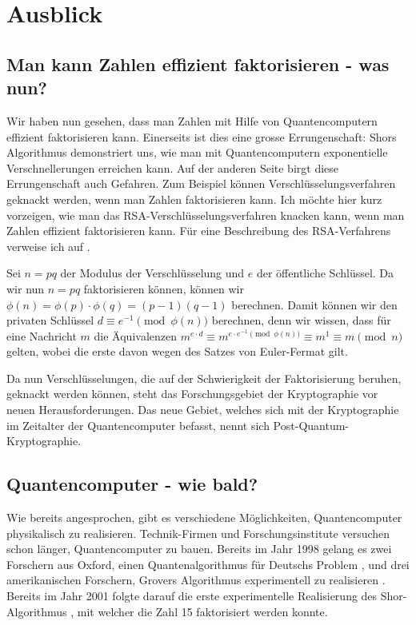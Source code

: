 \chapter{Ausblick}
\section{Man kann Zahlen effizient faktorisieren - was nun?}
Wir haben nun gesehen, dass man Zahlen mit Hilfe von Quantencomputern effizient faktorisieren kann. Einerseits ist dies eine grosse Errungenschaft: Shors Algorithmus demonstriert uns, wie man mit Quantencomputern exponentielle Verschnellerungen erreichen kann. Auf der anderen Seite birgt diese Errungenschaft auch Gefahren. Zum Beispiel können Verschlüsselungsverfahren geknackt werden, wenn man Zahlen faktorisieren kann. Ich möchte hier kurz vorzeigen, wie man das RSA-Verschlüsselungsverfahren knacken kann, wenn man Zahlen effizient faktorisieren kann. Für eine Beschreibung des RSA-Verfahrens verweise ich auf \cite{rsaorig}. 

Sei $n = pq$ der Modulus der Verschlüsselung und $e$ der öffentliche Schlüssel. Da wir nun $n = pq$ faktorisieren können, können wir $\phi(n) = \phi(p)\cdot\phi(q) = (p - 1)(q - 1)$ berechnen. Damit können wir den privaten Schlüssel $d \equiv e^{-1} \pmod{\phi(n)}$ berechnen, denn wir wissen, dass für eine Nachricht $m$ die Äquivalenzen $m^{e\cdot d} \equiv m^{e\cdot e^{-1} \pmod{\phi(n)}} \equiv m^1 \equiv m \pmod{n}$ gelten, wobei die erste davon wegen des Satzes von Euler-Fermat gilt.

Da nun Verschlüsselungen, die auf der Schwierigkeit der Faktorisierung beruhen, geknackt werden können, steht das Forschungsgebiet der Kryptographie vor neuen Herausforderungen. Das neue Gebiet, welches sich mit der Kryptographie im Zeitalter der Quantencomputer befasst, nennt sich Post-Quantum-Kryptographie.

\section{Quantencomputer - wie bald?}
Wie bereits angesprochen, gibt es verschiedene Möglichkeiten, Quantencomputer physikalisch zu realisieren. Technik-Firmen und Forschungsinstitute versuchen schon länger, Quantencomputer zu bauen. Bereits im Jahr 1998 gelang es zwei Forschern aus Oxford, einen Quantenalgorithmus für Deutschs Problem \cite{qimpdj}, und drei amerikanischen Forschern, Grovers Algorithmus experimentell zu realisieren \cite{qimpgr}. Bereits im Jahr 2001 folgte darauf die erste experimentelle Realisierung des Shor-Algorithmus \cite{ShorImp}, mit welcher die Zahl 15 faktorisiert werden konnte.

